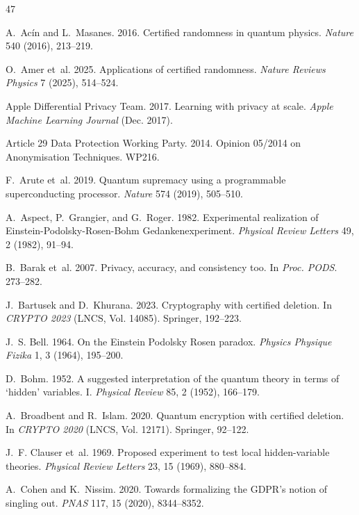\documentclass[acmsmall,screen,review,anonymous]{acmart}
\begin{document}
\begin{thebibliography}{47}

A.~Ac\'{i}n and L.~Masanes. 2016. Certified randomness in quantum physics. \emph{Nature} 540 (2016), 213--219.

O.~Amer et~al. 2025. Applications of certified randomness. \emph{Nature Reviews Physics} 7 (2025), 514--524.

{Apple Differential Privacy Team}. 2017. Learning with privacy at scale. \emph{Apple Machine Learning Journal} (Dec. 2017).

{Article 29 Data Protection Working Party}. 2014. Opinion 05/2014 on Anonymisation Techniques. WP216.

F.~Arute et~al. 2019. Quantum supremacy using a programmable superconducting processor. \emph{Nature} 574 (2019), 505--510.

A.~Aspect, P.~Grangier, and G.~Roger. 1982. Experimental realization of Einstein-Podolsky-Rosen-Bohm Gedankenexperiment. \emph{Physical Review Letters} 49, 2 (1982), 91--94.

B.~Barak et~al. 2007. Privacy, accuracy, and consistency too. In \emph{Proc. PODS}. 273--282.

J.~Bartusek and D.~Khurana. 2023. Cryptography with certified deletion. In \emph{CRYPTO 2023} (LNCS, Vol. 14085). Springer, 192--223.

J.~S. Bell. 1964. On the Einstein Podolsky Rosen paradox. \emph{Physics Physique Fizika} 1, 3 (1964), 195--200.

D.~Bohm. 1952. A suggested interpretation of the quantum theory in terms of `hidden' variables. I. \emph{Physical Review} 85, 2 (1952), 166--179.

A.~Broadbent and R.~Islam. 2020. Quantum encryption with certified deletion. In \emph{CRYPTO 2020} (LNCS, Vol. 12171). Springer, 92--122.

J.~F. Clauser et~al. 1969. Proposed experiment to test local hidden-variable theories. \emph{Physical Review Letters} 23, 15 (1969), 880--884.

A.~Cohen and K.~Nissim. 2020. Towards formalizing the GDPR's notion of singling out. \emph{PNAS} 117, 15 (2020), 8344--8352.


\end{thebibliography}
\end{document}
